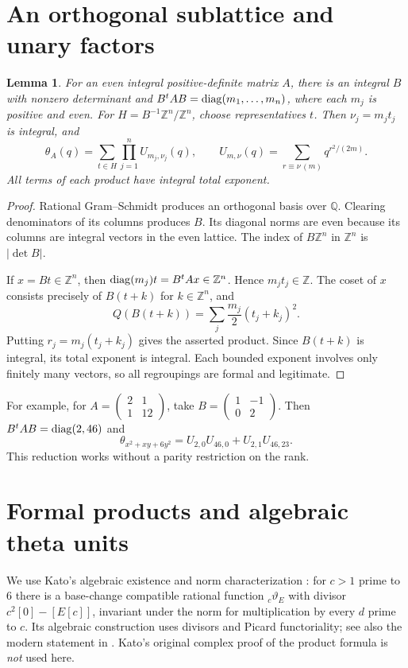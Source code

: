 \documentclass[11pt]{article}
\newtheorem{lemma}[theorem]{Lemma}
\theoremstyle{remark}\newtheorem{remark}[theorem]{Remark}
\newcommand{\Z}{\mathbb Z}\newcommand{\Q}{\mathbb Q}
\begin{document}
\section{An orthogonal sublattice and unary factors}\label{orthogonal}
\begin{lemma}\label{orthogonal-lemma}
For an even integral positive-definite matrix $A$, there is an integral
$B$ with nonzero determinant and $B^tAB=\operatorname{diag}(m_1,\ldots,m_n)$, where
each $m_j$ is positive and even. For
$H=B^{-1}\Z^n/\Z^n$, choose representatives $t$. Then
$\nu_j=m_jt_j$ is integral, and
\[
 \theta_A(q)=\sum_{t\in H}\prod_{j=1}^n U_{m_j,\nu_j}(q),\qquad
 U_{m,\nu}(q)=\sum_{r\equiv\nu\, (m)}q^{r^2/(2m)}.
\]
All terms of each product have integral total exponent.
\end{lemma}
\begin{proof}
Rational Gram--Schmidt produces an orthogonal basis over $\Q$. Clearing
denominators of its columns produces $B$. Its diagonal norms are even
because its columns are integral vectors in the even lattice. The index of
$B\Z^n$ in $\Z^n$ is $|\det B|$.

If $x=Bt\in\Z^n$, then
$\diag(m_j)t=B^tAx\in\Z^n$. Hence $m_jt_j\in\Z$.
The coset of $x$ consists precisely of $B(t+k)$ for $k\in\Z^n$, and
\[
 Q(B(t+k))=\sum_j\frac{m_j}{2}(t_j+k_j)^2.
\]
Putting $r_j=m_j(t_j+k_j)$ gives the asserted product. Since $B(t+k)$
is integral, its total exponent is integral. Each bounded exponent involves
only finitely many vectors, so all regroupings are formal and legitimate.
\end{proof}

For example, for $A=\left(\begin{smallmatrix}2&1\\1&12\end{smallmatrix}\right)$,
take $B=\left(\begin{smallmatrix}1&-1\\0&2\end{smallmatrix}\right)$.
Then $B^tAB=\operatorname{diag}(2,46)$ and
\[
 \theta_{x^2+xy+6y^2}=U_{2,0}U_{46,0}+U_{2,1}U_{46,23}.
\]
This reduction works without a parity restriction on the rank.

\section{Formal products and algebraic theta units}\label{tate}
We use Kato's algebraic existence and norm characterization
\cite[Proposition 1.3(1)]{kato}: for $c>1$ prime to $6$ there is a
base-change compatible rational function ${}_c\vartheta_E$ with divisor
$c^2[0]-[E[c]]$, invariant under the norm for multiplication by every
$d$ prime to $c$. Its algebraic construction uses divisors and Picard
functoriality; see also the modern statement in
\cite[Theorem 4.1.1]{klz}. Kato's original complex proof of the product formula is
\emph{not} used here.
\end{document}
